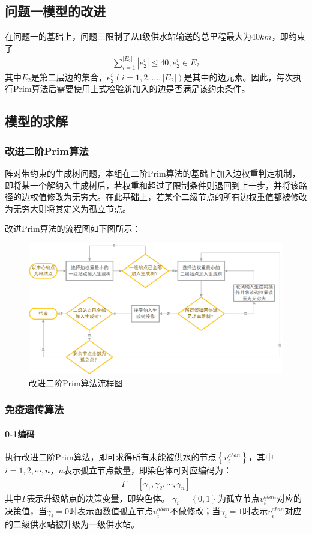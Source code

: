 \documentclass{whutmod}
\begin{document}
    	\subsection{问题一模型的改进}
    	在问题一的基础上，问题三限制了从I级供水站输送的总里程最大为$40km$，即约束了
    	\begin{gather*}
    	\sum_{i=1}^{|E_2|}|e_2^i|\leq 40,e_2^i\in E_2
    	\end{gather*}
    	其中$E_2$是第二层边的集合，$e_2^i(i=1,2,...,|E_2|)$是其中的边元素。因此，每次执行Prim算法后需要使用上式检验新加入的边是否满足该约束条件。
    	\subsection{模型的求解}
    	\subsubsection{改进二阶Prim算法}
    	阵对带约束的生成树问题，本组在二阶Prim算法的基础上加入边权重判定机制，即将某一个解纳入生成树后，若权重和超过了限制条件则退回到上一步，并将该路径的边权值修改为无穷大。在此基础上，若某个二级节点的所有边权重值都被修改为无穷大则将其定义为孤立节点。
    	
    	改进Prim算法的流程图如下图所示：
        \begin{figure}[H]
        	\centering
        	\includegraphics[width=\textwidth]{figures/a3.png}
        	\caption{改进二阶Prim算法流程图}\label{asd}
        \end{figure}
        
    		
  	
  	\subsubsection{免疫遗传算法}
  	\paragraph{0-1编码}
  	执行改进二阶Prim算法，即可求得所有未能被供水的节点$\left \{ v_i^{aban} \right \}$，其中$i=1,2,\cdots,n$，$n$表示孤立节点数量，即染色体可对应编码为：
  		\begin{gather}
  		\Gamma =[\gamma_1,\gamma_2,\cdots, \gamma_n]
  		\end{gather}
    其中$\Gamma$表示升级站点的决策变量，即染色体。 $\gamma_i=\left \{ 0,1 \right \}$为孤立节点$v_i^{aban}$对应的决策值，当$\gamma_i=0$时表示函数值孤立节点$v_i^{aban}$不做修改；当$\gamma_i=1$时表示$v_i^{aban}$对应的二级供水站被升级为一级供水站。
\end{document}
